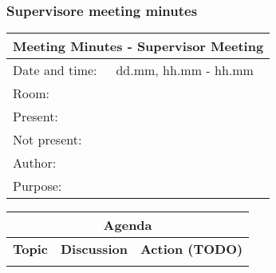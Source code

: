 \subsubsection{Supervisore meeting minutes}
\begin{tabular}{| p{4cm} | p{10cm} |}
	\hline
	\multicolumn{2}{|c|}{\Large \bf Meeting Minutes - Supervisor Meeting} \\ \hline
	Date and time: & dd.mm,  hh.mm - hh.mm \\ \hline
	Room: &  \\ \hline
	Present: &  \\ \hline
	Not present: &  \\ \hline
	Author: &  \\ \hline
	Purpose: &  \\ \hline
\end{tabular}

\begin{tabular}{| p{4cm} | p{6cm} | p{4cm} |}
	\hline
	\multicolumn{3}{|c|}{\Large \bf Agenda} \\ \hline
	{\bf Topic} & {\bf Discussion} & {\bf Action (TODO)} \\ \hline
	 & & \\ \hline


\end{tabular}